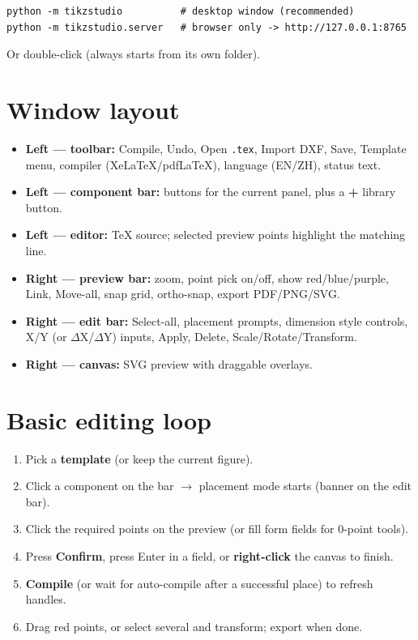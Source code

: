 \documentclass[a4paper]{ltxdoc}
\newcommand{\ui}[1]{\textbf{#1}}
\begin{document}
\begin{verbatim}
python -m tikzstudio          # desktop window (recommended)
python -m tikzstudio.server   # browser only -> http://127.0.0.1:8765
\end{verbatim}
Or double-click  (always starts from its own
folder).

\section{Window layout}

\begin{itemize}[nosep]
  \item \textbf{Left --- toolbar:} Compile, Undo, Open \texttt{.tex},
        Import DXF, Save, Template menu, compiler (XeLaTeX/pdfLaTeX),
        language (EN/ZH), status text.
  \item \textbf{Left --- component bar:} buttons for the current panel,
        plus a \ui{+} library button.
  \item \textbf{Left --- editor:} TeX source; selected preview points
        highlight the matching line.
  \item \textbf{Right --- preview bar:} zoom, point pick on/off, show
        red/blue/purple, Link, Move-all, snap grid, ortho-snap, export
        PDF/PNG/SVG.
  \item \textbf{Right --- edit bar:} Select-all, placement prompts,
        dimension style controls, X/Y (or $\Delta$X/$\Delta$Y) inputs,
        Apply, Delete, Scale/Rotate/Transform.
  \item \textbf{Right --- canvas:} SVG preview with draggable overlays.
\end{itemize}

\section{Basic editing loop}

\begin{enumerate}[nosep]
  \item Pick a \ui{template} (or keep the current figure).
  \item Click a component on the bar $\rightarrow$ placement mode starts
        (banner on the edit bar).
  \item Click the required points on the preview (or fill form fields for
        0-point tools).
  \item Press \ui{Confirm}, press Enter in a field, or
        \textbf{right-click} the canvas to finish.
  \item \ui{Compile} (or wait for auto-compile after a successful place)
        to refresh handles.
  \item Drag red points, or select several and transform; export when done.
\end{enumerate}
\end{document}
